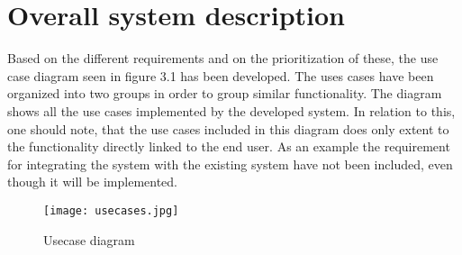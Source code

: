 \section{Overall system description}
Based on the different requirements and on the prioritization of these, the use case diagram seen in figure 3.1 has been developed. The uses cases have been organized into two groups in order to group similar functionality. The diagram shows all the use cases implemented by the developed system. In relation to this, one should note, that the use cases included in this diagram does only extent to the functionality directly linked to the end user. As an example the requirement for integrating the system with the existing system have not been included, even though it will be implemented.
\begin{figure}
\begin{center}
\texttt{[image: usecases.jpg]}
\end{center}
\caption{Usecase diagram}
\end{figure}